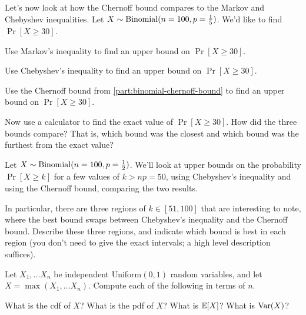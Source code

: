 \documentclass[11pt]{article}
\begin{document}
\begin{Parts}
    \item Let's now look at how the Chernoff bound compares to the Markov and Chebyshev inequalities. Let $X \sim \operatorname{Binomial}(n = 100, p = \frac{1}{5})$. We'd like to find $\Pr[X \ge 30]$.

        \begin{Parts}
            \item Use Markov's inequality to find an upper bound on $\Pr[X \ge 30]$.

            \item Use Chebyshev's inequality to find an upper bound on $\Pr[X \ge 30]$.

            \item Use the Chernoff bound from \cref{part:binomial-chernoff-bound} to find an upper bound on $\Pr[X \ge 30]$.

            \item Now use a calculator to find the exact value of $\Pr[X \ge 30]$. How did the three bounds compare? That is, which bound was the closest and which bound was the furthest from the exact value?
        \end{Parts}

    \item Let $X \sim \operatorname{Binomial}(n = 100, p =\frac{1}{2})$. We'll look at upper bounds on the probability $\Pr[X \ge k]$ for a few values of $k > np = 50$, using Chebyshev's inequality and using the Chernoff bound, comparing the two results.

        In particular, there are three regions of $k \in [51, 100]$ that are interesting to note, where the best bound swaps between Chebyshev's inequality and the Chernoff bound. Describe these three regions, and indicate which bound is best in each region (you don't need to give the exact intervals; a high level description suffices).
\end{Parts}



Let $X_1,...X_n$ be independent Uniform$(0,1)$ random variables, and let $X = \max(X_1,...X_n)$. 
Compute each of the following in terms of $n$.
\begin{Parts}
	\Part What is the cdf of $X$?
	\Part What is the pdf of $X$?
	\Part What is $\operatorname{\mathbb{E}}[X]$?
	\Part What is $\operatorname{Var}(X)$?
\end{Parts}

\end{document}
